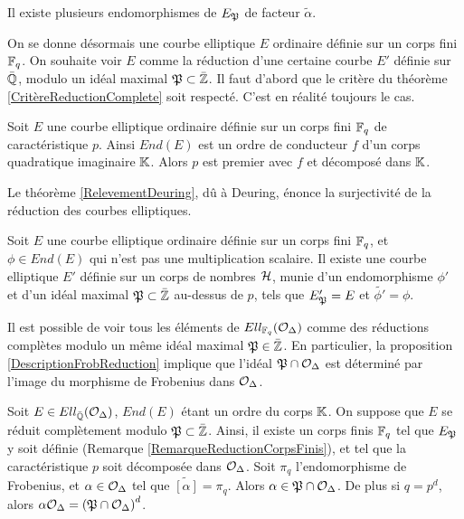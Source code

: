 \begin{Rem}
	Il existe plusieurs endomorphismes de $E_{\mathfrak{P}}$ de facteur $\tilde{\alpha}$.
\end{Rem}

On se donne désormais une courbe elliptique $E$ ordinaire définie sur un corps fini $\mathbb{F}_{q}$. On souhaite voir $E$ comme la réduction d'une certaine courbe $E'$ définie sur $\bar{\mathbb{Q}}$, modulo un idéal maximal $\mathfrak{P}\subset\bar{\mathbb{Z}}$. Il faut d'abord que le critère du théorème \ref{CritèreReductionComplete} soit respecté. C'est en réalité toujours le cas.

\begin{The}
	
	Soit $E$ une courbe elliptique ordinaire définie sur un corps fini $\mathbb{F}_{q}$ de caractéristique $p$. Ainsi $End(E)$ est un ordre de conducteur $f$ d'un corps quadratique imaginaire $\mathbb{K}$. Alors $p$ est premier avec $f$ et décomposé dans $\mathbb{K}$. 
	
\end{The}

Le théorème \ref{RelevementDeuring}, dû à Deuring, énonce la surjectivité de la réduction des courbes elliptiques. 

\begin{The}\label{RelevementDeuring}
	
	Soit $E$ une courbe elliptique ordinaire définie sur un corps fini $\mathbb{F}_{q}$, et $\phi\in End(E)$ qui n'est pas une multiplication scalaire. Il existe une courbe elliptique $E'$ définie sur un corps de nombres $\mathcal{H}$, munie d'un endomorphisme $\phi'$ et d'un idéal maximal $\mathfrak{P}\subset\bar{\mathbb{Z}}$ au-dessus de $p$, tels que $E'_{\mathfrak{P}} = E$ et $\tilde{\phi'} = \phi$.
	
\end{The}

Il est possible de voir tous les éléments de $Ell_{\mathbb{F}_{q}}(\mathcal{O}_{\Delta})$ comme des réductions complètes modulo un même idéal maximal $\mathfrak{P}\in\bar{\mathbb{Z}}$. En particulier, la proposition \ref{DescriptionFrobReduction} implique que l'idéal $\mathfrak{P}\cap\mathcal{O}_{\Delta}$ est déterminé par l'image du morphisme de Frobenius dans $\mathcal{O}_{\Delta}$. 

\begin{Prop}\label{DescriptionFrobReduction}
	
	Soit $E\in Ell_{\bar{\mathbb{Q}}}(\mathcal{O}_\Delta)$, $End(E)$ étant un ordre du corps $\mathbb{K}$. On suppose que $E$ se réduit complètement modulo $\mathfrak{P}\subset\bar{\mathbb{Z}}$. Ainsi, il existe un corps finis $\mathbb{F}_{q}$ tel que $E_{\mathfrak{P}}$ y soit définie (Remarque \ref{RemarqueReductionCorpsFinis}), et tel que la caractéristique $p$ soit décomposée dans $\mathcal{O}_{\Delta}$. Soit $\pi_{q}$ l'endomorphisme de Frobenius, et $\alpha\in\mathcal{O}_{\Delta}$ tel que $\widetilde{[\alpha]} = \pi_{q}$. Alors $\alpha\in \mathfrak{P}\cap\mathcal{O}_{\Delta}$. De plus si $q = p^d$, alors $\alpha\mathcal{O}_{\Delta} = \left(\mathfrak{P}\cap\mathcal{O}_{\Delta} \right) ^{d}$.
	
	
\end{Prop}

